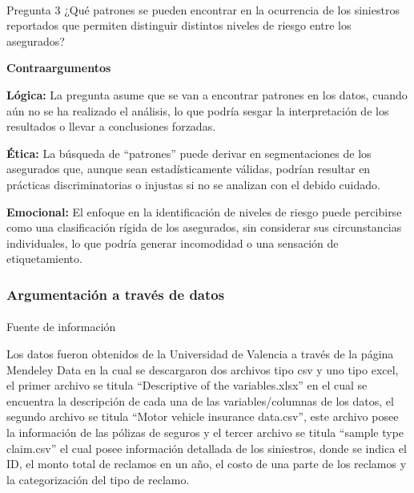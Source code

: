 \documentclass[
  spanish,
  11pt,
  letterpaper,
]{article}
\makeatletter
\let\oldparagraph\paragraph
\renewcommand{\paragraph}{
    \@ifstar
      \xxxParagraphStar
      \xxxParagraphNoStar
  }
\newcommand{\xxxParagraphStar}[1]{\oldparagraph*{#1}\mbox{}}
\newcommand{\xxxParagraphNoStar}[1]{\oldparagraph{#1}\mbox{}}
\makeatother
\begin{document}
\paragraph{Pregunta 3 ¿Qué patrones se pueden encontrar en la ocurrencia
de los siniestros reportados que permiten distinguir distintos niveles
de riesgo entre los
asegurados?}\label{pregunta-3-quuxe9-patrones-se-pueden-encontrar-en-la-ocurrencia-de-los-siniestros-reportados-que-permiten-distinguir-distintos-niveles-de-riesgo-entre-los-asegurados}

\textbf{Contraargumentos}

\textbf{Lógica:} La pregunta asume que se van a encontrar patrones en
los datos, cuando aún no se ha realizado el análisis, lo que podría
sesgar la interpretación de los resultados o llevar a conclusiones
forzadas.

\textbf{Ética:} La búsqueda de ``patrones'' puede derivar en
segmentaciones de los asegurados que, aunque sean estadísticamente
válidas, podrían resultar en prácticas discriminatorias o injustas si no
se analizan con el debido cuidado.

\textbf{Emocional:} El enfoque en la identificación de niveles de riesgo
puede percibirse como una clasificación rígida de los asegurados, sin
considerar sus circunstancias individuales, lo que podría generar
incomodidad o una sensación de etiquetamiento.

\subsubsection{Argumentación a través de
datos}\label{argumentaciuxf3n-a-travuxe9s-de-datos}

\paragraph{Fuente de información}\label{fuente-de-informaciuxf3n}

Los datos fueron obtenidos de la Universidad de Valencia a través de la
página Mendeley Data en la cual se descargaron dos archivos tipo csv y
uno tipo excel, el primer archivo se titula ``Descriptive of the
variables.xlsx'' en el cual se encuentra la descripción de cada una de
las variables/columnas de los datos, el segundo archivo se titula
``Motor vehicle insurance data.csv'', este archivo posee la información
de las pólizas de seguros y el tercer archivo se titula ``sample type
claim.csv'' el cual posee información detallada de los siniestros, donde
se indica el ID, el monto total de reclamos en un año, el costo de una
parte de los reclamos y la categorización del tipo de reclamo.
\end{document}
